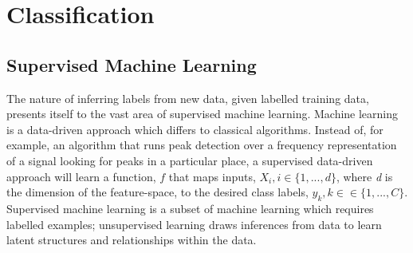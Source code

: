 \section{Classification}
\label{sec:pl-clf}

    \subsection{Supervised Machine Learning}
    \label{subsec:pl-clf-sup}
        The nature of inferring labels from new data, given labelled training data, presents itself to the vast area of supervised machine learning. Machine learning is a data-driven approach which differs to classical algorithms. Instead of, for example, an algorithm that runs peak detection over a frequency representation of a signal looking for peaks in a particular place, a supervised data-driven approach will learn a function, $f$ that maps inputs, $X_i, i\in\{1,...,d\}$, where \textit{d} is the dimension of the feature-space, to the desired class labels, $y_k,k\in\in\{1,...,C\}$. Supervised machine learning is a subset of machine learning which requires labelled examples; unsupervised learning draws inferences from data to learn latent structures and relationships within the data.
        
